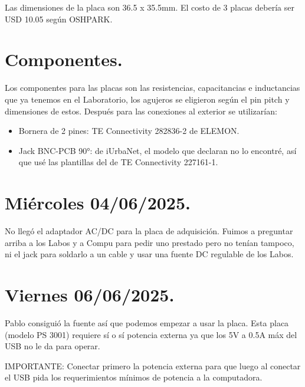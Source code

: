 Las dimensiones de la placa son 36.5 x 35.5mm. El costo de 3 placas debería ser USD 10.05 según OSHPARK. %

\section{Componentes.}
Los componentes para las placas son las resistencias, capacitancias e inductancias que ya tenemos en el Laboratorio, los agujeros se eligieron según el pin pitch y dimensiones de estos. Después para las conexiones al exterior se utilizarían:

\begin{itemize}
	\item Bornera de 2 pines: TE Connectivity 282836-2 de ELEMON.
	\item Jack BNC-PCB 90°: de iUrbaNet, el modelo que declaran no lo encontré, así que usé las plantillas del de TE Connectivity 227161-1.
\end{itemize}

\section{Miércoles 04/06/2025.} %
No llegó el adaptador AC/DC para la placa de adquisición. Fuimos a preguntar arriba a los Labos y a Compu para pedir uno prestado pero no tenían tampoco, ni el jack para soldarlo a un cable y usar una fuente DC regulable de los Labos.

\section{Viernes 06/06/2025.}
Pablo consiguió la fuente así que podemos empezar a usar la placa. Esta placa (modelo PS 3001) requiere sí o sí potencia externa ya que los 5V a 0.5A máx del USB no le da para operar.  

IMPORTANTE: Conectar primero la potencia externa para que luego al conectar el USB pida los requerimientos mínimos de potencia a la computadora.

